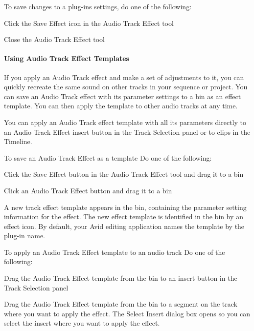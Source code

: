 To save changes to a plug-\/in\textquotesingle{}s settings, do one of the following\+: 
\begin{DoxyItemize}
\item Click the Save Effect icon in the Audio Track Effect tool  
\item Close the Audio Track Effect tool  
\end{DoxyItemize}

\hypertarget{a00831_subsubsectin__media_composer_guide__using_templates}{}\paragraph{Using Audio Track Effect Templates}\label{a00831_subsubsectin__media_composer_guide__using_templates}
 If you apply an Audio Track effect and make a set of adjustments to it, you can quickly recreate the same sound on other tracks in your sequence or project. You can save an Audio Track effect with its parameter settings to a bin as an effect template. You can then apply the template to other audio tracks at any time.

You can apply an Audio Track effect template with all its parameters directly to an Audio Track Effect insert button in the Track Selection panel or to clips in the Timeline.

To save an Audio Track Effect as a template  Do one of the following\+: 
\begin{DoxyItemize}
\item Click the Save Effect button in the Audio Track Effect tool and drag it to a bin  
\item Click an Audio Track Effect button and drag it to a bin  
\end{DoxyItemize}

A new track effect template appears in the bin, containing the parameter setting information for the effect. The new effect template is identified in the bin by an effect icon. By default, your Avid editing application names the template by the plug-\/in name.

To apply an Audio Track Effect template to an audio track  Do one of the following\+: 
\begin{DoxyItemize}
\item Drag the Audio Track Effect template from the bin to an insert button in the Track Selection panel  
\item Drag the Audio Track Effect template from the bin to a segment on the track where you want to apply the effect. The Select Insert dialog box opens so you can select the insert where you want to apply the effect.  
\end{DoxyItemize}

